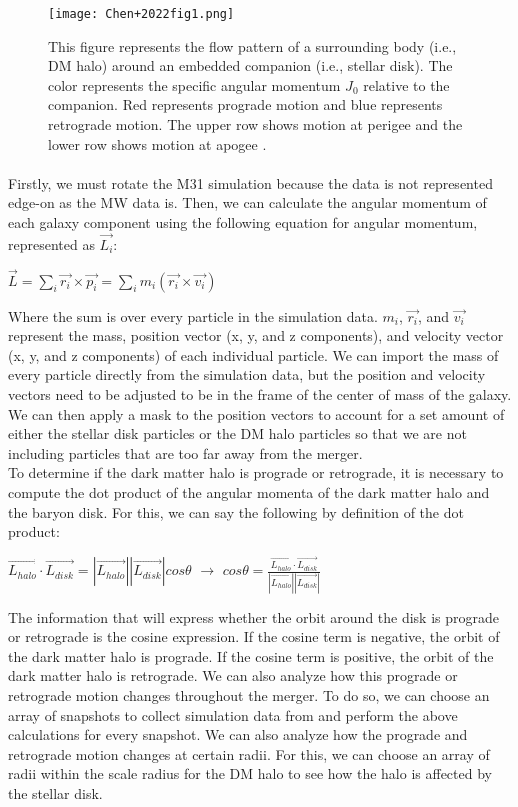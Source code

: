 \documentclass[fleqn,usenatbib]{mnras}
\begin{document}
\begin{figure}
    \centering
    \texttt{[image: Chen+2022fig1.png]}
    \caption{This figure represents the flow pattern of a surrounding body (i.e., DM halo) around an embedded companion (i.e., stellar disk). The color represents the specific angular momentum $J_0$ relative to the companion. Red represents prograde motion and blue represents retrograde motion. The upper row shows motion at perigee and the lower row shows motion at apogee \citep{Chen+2022}.}
    \label{ChenProRetro}
    
\end{figure}

\paragraph{} Firstly, we must rotate the M31 simulation because the data is not represented edge-on as the MW data is. Then, we can calculate the angular momentum of each galaxy component using the following equation for angular momentum, represented as $\vec{L_i}$:
\begin{center}
    $\vec{L} = \sum_{i} \vec{r_i} \times \vec{p_i} = \sum_{i} m_i (\vec{r_i} \times \vec{v_i})$
\end{center}
Where the sum is over every particle in the simulation data. $m_i$, $\vec{r_i}$, and $\vec{v_i}$ represent the mass, position vector (x, y, and z components), and velocity vector (x, y, and z components) of each individual particle. We can import the mass of every particle directly from the simulation data, but the position and velocity vectors need to be adjusted to be in the frame of the center of mass of the galaxy. We can then apply a mask to the position vectors to account for a set amount of either the stellar disk particles or the DM halo particles so that we are not including particles that are too far away from the merger.
\\To determine if the dark matter halo is prograde or retrograde, it is necessary to compute the dot product of the angular momenta of the dark matter halo and the baryon disk. For this, we can say the following by definition of the dot product:
\begin{center}
    $\vec{L_{halo}} \cdot \vec{L_{disk}} = |\vec{L_{halo}}||\vec{L_{disk}}|cos\theta$ $\rightarrow$ $cos\theta = \frac{\vec{L_{halo}} \cdot \vec{L_{disk}}}{|\vec{L_{halo}}||\vec{L_{disk}}|}$
\end{center}
The information that will express whether the orbit around the disk is prograde or retrograde is the cosine expression. If the cosine term is negative, the orbit of the dark matter halo is prograde. If the cosine term is positive, the orbit of the dark matter halo is retrograde. We can also analyze how this prograde or retrograde motion changes throughout the merger. To do so, we can choose an array of snapshots to collect simulation data from and perform the above calculations for every snapshot. We can also analyze how the prograde and retrograde motion changes at certain radii. For this, we can choose an array of radii within the scale radius for the DM halo to see how the halo is affected by the stellar disk.
\end{document}
